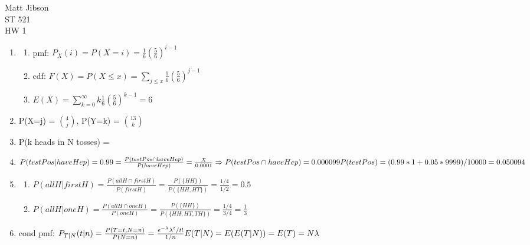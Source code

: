 \documentclass{article}
\begin{document}
\begin{flushright}
Matt Jibson \\
ST 521 \\
HW 1
\end{flushright}

\begin{enumerate}

\item %
	\begin{enumerate}
		\item pmf: $P_X(i) = P(X=i) = \frac{1}{6} (\frac{5}{6})^{i-1}$
		\item cdf: $F(X) = P(X \le x) = \sum_{j \le x} \frac{1}{6} (\frac{5}{6})^{j-1}$
		\item $E(X) = \sum_{k=0}^{\infty} k \frac{1}{6} (\frac{5}{6})^{k-1} = 6$
	\end{enumerate}
\item %
	P(X=j) = $\binom{4}{j}$, P(Y=k) = $\binom{13}{k}$
\item %
	P(k heads in N tosses) =
\item %
	$P(testPos | haveHep) = 0.99 = \frac{P(testPos \cap haveHep)}{P(haveHep)} = \frac{X}{0.0001} \Rightarrow P(testPos \cap haveHep) = 0.000099 \\
	P(testPos) = (0.99 * 1 + 0.05 * 9999) / 10000 = 0.050094 $\\
\item %
	\begin{enumerate}
		\item $P(all H | first H) = \frac{P(all H \cap first H)}{P(first H)} = \frac{P(\{HH\})}{P(\{HH, HT\})} = \frac{1/4}{1/2} = 0.5$
		\item $P(all H | one H) = \frac{P(all H \cap one H)}{P(one H)} = \frac{P(\{HH\})}{P(\{HH, HT, TH\})} = \frac{1/4}{3/4} = \frac{1}{3}$
	\end{enumerate}
\item %
	cond pmf: $P_{T|N}(t|n) = \frac{P(T=t, N=n)}{P(N=n)} = \frac{e^{- \lambda} \lambda^t / t!}{1/n} \\ %
	E(T|N) = \\
	E(E(T|N)) = E(T) = N \lambda$

\end{enumerate}
\end{document}

